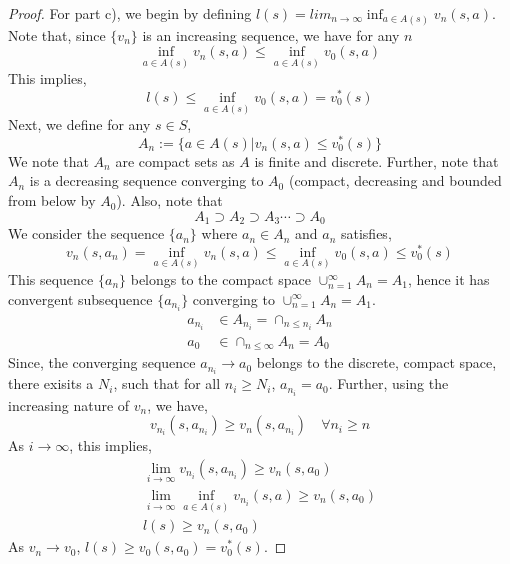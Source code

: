 \begin{proof}
For part c), we begin by defining $l(s)=lim_{n\to \infty}\inf_{a\in A(s)}v_n(s,a)$. Note that, since $\{v_n\}$ is an increasing sequence, we have for any $n$
\begin{equation}
    \inf_{a\in A(s)}v_n(s,a) \leq \inf_{a\in A(s)}v_0(s,a)
\end{equation}
This implies,
\begin{equation}
   l(s) \leq \inf_{a\in A(s)}v_0(s,a)=v_0^{*}(s)
\end{equation}
Next, we define for any $s\in S$, 
\begin{equation}
    A_n:=\{a\in A(s)|v_n(s,a)\leq v_0^*(s)\}
\end{equation}
We note that $A_n$ are compact sets as $A$ is finite and discrete. Further, note that
$A_n$ is a decreasing sequence converging to $A_0$ (compact, decreasing and bounded from below by $A_0$). Also, note that
\begin{equation}
    A_1 \supset A_2 \supset A_3 \cdots \supset A_0
\end{equation}
We consider the sequence $\{a_n\}$ where $a_n\in A_n$ and $a_n$ satisfies,
\begin{equation}
    v_n(s,a_n)=\inf_{a\in A(s)}v_n(s,a)\leq \inf_{a\in A(s)}v_0(s,a)\leq v_{0}^{*}(s)
\end{equation}
This sequence $\{a_n\}$ belongs to the compact space $\cup_{n=1}^{\infty}A_n=A_1$, hence it has convergent subsequence $\{a_{n_i}\}$ converging to  $\cup_{n=1}^{\infty}A_n=A_1$. 
\begin{align}
    a_{n_i}&\in A_{n_i}=\cap_{n\leq n_i}A_n\\
    a_{0}&\in \cap_{n\leq \infty }A_n =A_0
\end{align}
 Since, the converging sequence $a_{n_i}\to a_0 $ belongs to the discrete, compact space, there exisits a $N_i$, such that for all  $n_i \geq N_i$, $a_{n_i}= a_0$. Further, using the increasing nature of $v_n$, we have,
\begin{equation}
    v_{n_i}(s,a_{n_i})\geq v_n(s, a_{n_i}) \quad \forall n_i \geq n
\end{equation}
As $i\to\infty$, this implies,  
\begin{align}
    \lim_{i\to\infty } v_{n_i}(s,a_{n_i})\geq v_n(s, a_{0}) \\
    \lim_{i\to\infty } \inf_{a\in A(s)} v_{n_i}(s,a)\geq v_n(s, a_{0})\\
    l(s)\geq v_n(s,a_0)
\end{align}
As $v_n \to v_0$, $l(s)\geq v_0(s,a_0)=v_0^{*}(s)$. 

\end{proof}

